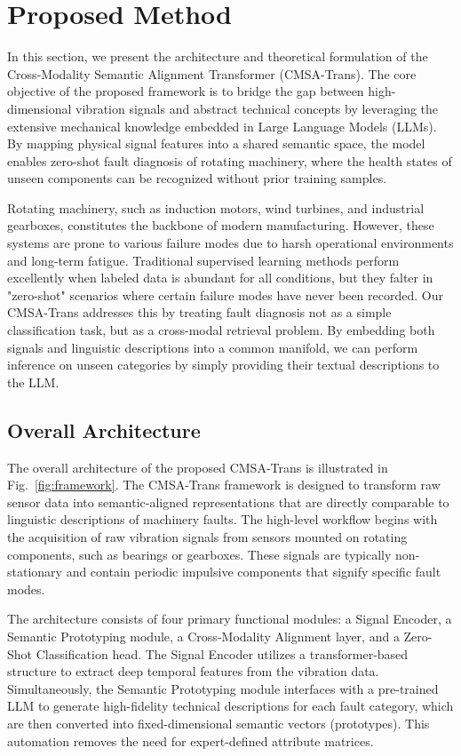 \section{Proposed Method}
In this section, we present the architecture and theoretical formulation of the Cross-Modality Semantic Alignment Transformer (CMSA-Trans). The core objective of the proposed framework is to bridge the gap between high-dimensional vibration signals and abstract technical concepts by leveraging the extensive mechanical knowledge embedded in Large Language Models (LLMs). By mapping physical signal features into a shared semantic space, the model enables zero-shot fault diagnosis of rotating machinery, where the health states of unseen components can be recognized without prior training samples.

Rotating machinery, such as induction motors, wind turbines, and industrial gearboxes, constitutes the backbone of modern manufacturing. However, these systems are prone to various failure modes due to harsh operational environments and long-term fatigue. Traditional supervised learning methods perform excellently when labeled data is abundant for all conditions, but they falter in "zero-shot" scenarios where certain failure modes have never been recorded. Our CMSA-Trans addresses this by treating fault diagnosis not as a simple classification task, but as a cross-modal retrieval problem. By embedding both signals and linguistic descriptions into a common manifold, we can perform inference on unseen categories by simply providing their textual descriptions to the LLM.

\subsection{Overall Architecture}
The overall architecture of the proposed CMSA-Trans is illustrated in Fig.~\ref{fig:framework}. The CMSA-Trans framework is designed to transform raw sensor data into semantic-aligned representations that are directly comparable to linguistic descriptions of machinery faults. The high-level workflow begins with the acquisition of raw vibration signals from sensors mounted on rotating components, such as bearings or gearboxes. These signals are typically non-stationary and contain periodic impulsive components that signify specific fault modes.

The architecture consists of four primary functional modules: a Signal Encoder, a Semantic Prototyping module, a Cross-Modality Alignment layer, and a Zero-Shot Classification head. The Signal Encoder utilizes a transformer-based structure \cite{vaswani2017attention, zerveas2021transformer} to extract deep temporal features from the vibration data. Simultaneously, the Semantic Prototyping module interfaces with a pre-trained LLM \cite{radford2021learning} to generate high-fidelity technical descriptions for each fault category, which are then converted into fixed-dimensional semantic vectors (prototypes). This automation removes the need for expert-defined attribute matrices.

